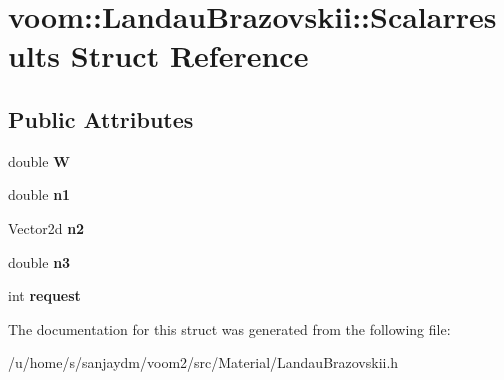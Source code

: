 \hypertarget{structvoom_1_1_landau_brazovskii_1_1_scalarresults}{
\section{voom::LandauBrazovskii::Scalarresults Struct Reference}
\label{structvoom_1_1_landau_brazovskii_1_1_scalarresults}
}
\subsection*{Public Attributes}
\begin{DoxyCompactItemize}
\item 
\hypertarget{structvoom_1_1_landau_brazovskii_1_1_scalarresults_a55e3d09ba2147b9deb5d0cfc5d6291f5}{
double {\bfseries W}}
\label{structvoom_1_1_landau_brazovskii_1_1_scalarresults_a55e3d09ba2147b9deb5d0cfc5d6291f5}

\item 
\hypertarget{structvoom_1_1_landau_brazovskii_1_1_scalarresults_a337aa8739aa6b2ab3db85c1aad8e5156}{
double {\bfseries n1}}
\label{structvoom_1_1_landau_brazovskii_1_1_scalarresults_a337aa8739aa6b2ab3db85c1aad8e5156}

\item 
\hypertarget{structvoom_1_1_landau_brazovskii_1_1_scalarresults_a49bf49a09733d83d2c6a2ba812b1e479}{
Vector2d {\bfseries n2}}
\label{structvoom_1_1_landau_brazovskii_1_1_scalarresults_a49bf49a09733d83d2c6a2ba812b1e479}

\item 
\hypertarget{structvoom_1_1_landau_brazovskii_1_1_scalarresults_adb9f79781a8f1069cc581a6b89238f79}{
double {\bfseries n3}}
\label{structvoom_1_1_landau_brazovskii_1_1_scalarresults_adb9f79781a8f1069cc581a6b89238f79}

\item 
\hypertarget{structvoom_1_1_landau_brazovskii_1_1_scalarresults_aa91694adacdf8e2784fd81f9970272c5}{
int {\bfseries request}}
\label{structvoom_1_1_landau_brazovskii_1_1_scalarresults_aa91694adacdf8e2784fd81f9970272c5}

\end{DoxyCompactItemize}


The documentation for this struct was generated from the following file:\begin{DoxyCompactItemize}
\item 
/u/home/s/sanjaydm/voom2/src/Material/LandauBrazovskii.h\end{DoxyCompactItemize}
